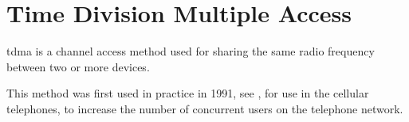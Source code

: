 \chapter{Time Division Multiple Access}\label{TDMA}





\gls{tdma} is a channel access method used for sharing the same radio frequency between two or more devices.

This method was first used in practice in 1991, see \cite{networkencyclopedia2013time}, for use in the cellular telephones, to increase the number of concurrent users on the telephone network.

